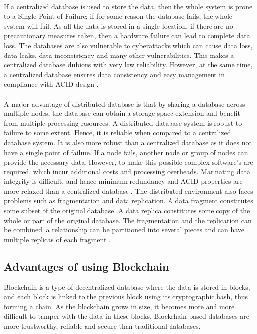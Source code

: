 \documentclass[12pt]{article}
\begin{document}
        \paragraph{}
        If a centralized database is used to store the data, then the whole system is prone to a Single Point of Failure; if for some reason the database fails, the whole system will fail. As all the data is stored in a single location, if there are no precautionary measures taken, then a hardware failure can lead to complete data loss. The databases are also vulnerable to cyberattacks which can cause data loss, data leaks, data inconsistency and many other vulnerabilities. This makes a centralized database dubious with very low reliability. However, at the same time, a centralized database ensures data consistency and easy management in compliance with ACID design \cite{centralizeddistributeddatabases}.
        
        \paragraph{}
        A major advantage of distributed database is that by sharing a database across multiple nodes, the database can obtain a storage space extension and benefit from multiple processing resources. A distributed database system is robust to failure to some extent. Hence, it is reliable when compared to a  centralized database system. It is also more robust than a centralized database as it does not have a single point of failure. If a node fails, another node or group of nodes can provide the necessary data. However, to make this possible complex software's are required, which incur additional costs and processing overheads. Marinating data integrity is difficult, and hence minimum redundancy and ACID properties are more relaxed than a centralized database \cite{centralizeddistributeddatabases}. The distributed environment also faces problems such as fragmentation and data replication. A data fragment constitutes some subset of the original database. A data replica constitutes some copy of the whole or part of the original database. The fragmentation and the replication can be combined: a relationship can be partitioned into several pieces and can have multiple replicas of each fragment \cite{distributedsystems}.
        
    \subsection{Advantages of using Blockchain}
        Blockchain is a type of decentralized database where the data is stored in blocks, and each block is linked to the previous block using its cryptographic hash, thus forming a chain. As the blockchain grows in size, it becomes more and more difficult to tamper with the data in these blocks. Blockchain based databases are more trustworthy, reliable and secure than traditional databases.
\end{document}
